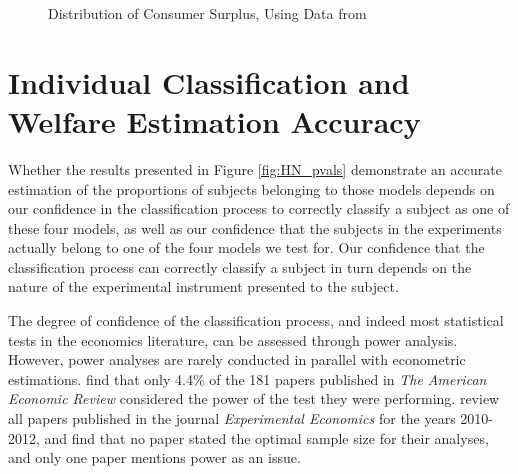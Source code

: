 \documentclass[../main.tex]{subfiles}
\begin{document}
\begin{figure}[h!]
	\center
	\caption{Distribution of Consumer Surplus, Using Data from \textcite{Harrison2016}}
	\label{fig:HN_CS}
\end{figure}

\section{Individual Classification and Welfare Estimation Accuracy}
\label{sec4:IC}

Whether the results presented in Figure \ref{fig:HN_pvals} demonstrate an accurate estimation of the proportions of subjects belonging to those models depends on our confidence in the classification process to correctly classify a subject as one of these four models, as well as our confidence that the subjects in the experiments actually belong to one of the four models we test for.
Our confidence that the classification process can correctly classify a subject in turn depends on the nature of the experimental instrument presented to the subject.

The degree of confidence of the classification process, and indeed most statistical tests in the economics literature, can be assessed through power analysis.
However, power analyses are rarely conducted in parallel with econometric estimations.
\textcite{McCloskey1996} find that only 4.4\% of the 181 papers published in \textit{The American Economic Review} considered the power of the test they were performing.
\textcite[6]{Zhang2013} review all papers published in the journal \textit{Experimental Economics} for the years 2010-2012, and find that no paper stated the optimal sample size for their analyses, and only one paper mentions power as an issue.
\end{document}
